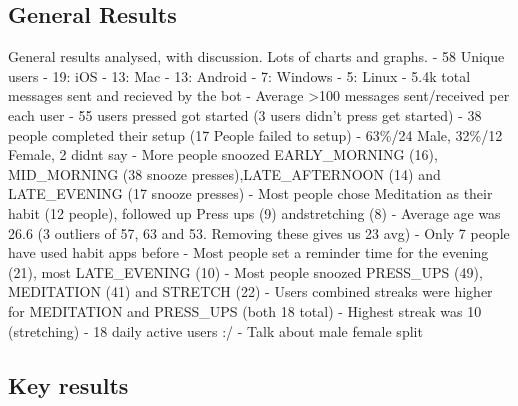 \subsection{General Results}
General results analysed, with discussion. Lots of charts and graphs.
\newline
- 58 Unique users\newline
  - 19: iOS\newline
  - 13: Mac\newline
  - 13: Android\newline
  - 7: Windows\newline
  - 5: Linux\newline
- 5.4k total messages sent and recieved by the bot\newline
- Average >100 messages sent/received per each user\newline
- 55 users pressed got started (3 users didn't press get started)\newline
- 38 people completed their setup (17 People failed to setup)\newline
- 63\%/24 Male, 32\%/12 Female, 2 didnt say\newline
- More people snoozed EARLY\_MORNING (16), MID\_MORNING (38 snooze presses),\newline LATE\_AFTERNOON (14) and LATE\_EVENING (17 snooze presses)
- Most people chose Meditation as their habit (12 people), followed up Press ups (9) and\newline stretching (8)
- Average age was 26.6 (3 outliers of 57, 63 and 53. Removing these gives us 23 avg)\newline
- Only 7 people have used habit apps before\newline
- Most people set a reminder time for the evening (21), most LATE\_EVENING (10)\newline
- Most people snoozed PRESS\_UPS (49), MEDITATION (41) and STRETCH (22)\newline
- Users combined streaks were higher for MEDITATION and PRESS\_UPS (both 18 total)\newline
- Highest streak was 10 (stretching)\newline
- 18 daily active users :/\newline
- Talk about male female split\newline

\subsection{Key results}

